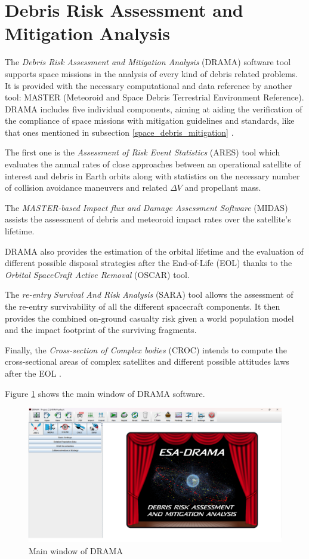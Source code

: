 \section{Debris Risk Assessment and Mitigation Analysis}
The \textit{Debris Risk Assessment and Mitigation Analysis} (DRAMA) software tool supports space missions in the analysis of every kind of debris related problems.
It is provided with the necessary computational and data reference by another tool: MASTER (Meteoroid and Space Debris Terrestrial Environment Reference).
DRAMA includes five individual components, aiming at  aiding the verification of the compliance of space missions with mitigation guidelines and standards, like that ones mentioned in subsection \ref{space_debris_mitigation} \cite{braun2013drama}.

The first one is the \textit{Assessment of Risk Event Statistics} (ARES) tool which evaluates the annual rates of close approaches between an operational satellite of interest and debris in Earth orbits along with statistics on the necessary number of collision avoidance maneuvers and related $\Delta V$ and propellant mass.

The \textit{MASTER-based Impact flux and Damage Assessment Software} (MIDAS) assists the assessment of debris and meteoroid impact rates over the satellite's lifetime.

DRAMA also provides the estimation of the orbital lifetime and the evaluation of different possible disposal strategies after the End-of-Life (EOL) thanks to the \textit{Orbital SpaceCraft Active Removal} (OSCAR) tool.

The \textit{re-entry Survival And Risk Analysis} (SARA) tool allows the assessment of the re-entry survivability of all the different spacecraft components. 
It then provides the combined on-ground casualty risk given a world population model and the impact footprint of the surviving fragments.  

Finally, the \textit{Cross-section of Complex bodies} (CROC) intends to compute the cross-sectional areas of complex satellites and different possible attitudes laws after the EOL \cite{braun2020drama}.

Figure \ref{drama_main_window} shows the main window of DRAMA software.
\begin{figure}
    \centering
    \includegraphics[scale=0.25]{img/drama_mainwindow.png}
    \caption{Main window of DRAMA}
    \label{drama_main_window}
\end{figure}